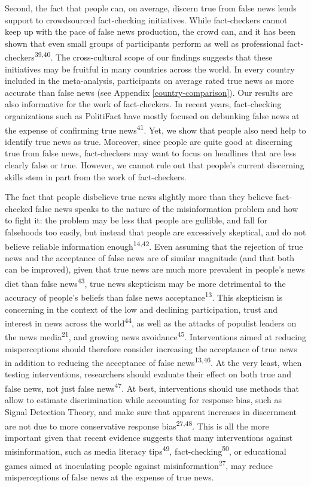 \documentclass[
  doc,floatsintext]{apa6}
\begin{document}
Second, the fact that people can, on average, discern true from false news lends support to crowdsourced fact-checking initiatives. While fact-checkers cannot keep up with the pace of false news production, the crowd can, and it has been shown that even small groups of participants perform as well as professional fact-checkers\textsuperscript{39,40}. The cross-cultural scope of our findings suggests that these initiatives may be fruitful in many countries across the world. In every country included in the meta-analysis, participants on average rated true news as more accurate than false news (see Appendix \ref{country-comparison}). Our results are also informative for the work of fact-checkers. In recent years, fact-checking organizations such as PolitiFact have mostly focused on debunking false news at the expense of confirming true news\textsuperscript{41}. Yet, we show that people also need help to identify true news as true. Moreover, since people are quite good at discerning true from false news, fact-checkers may want to focus on headlines that are less clearly false or true. However, we cannot rule out that people's current discerning skills stem in part from the work of fact-checkers.

The fact that people disbelieve true news slightly more than they believe fact-checked false news speaks to the nature of the misinformation problem and how to fight it: the problem may be less that people are gullible, and fall for falsehoods too easily, but instead that people are excessively skeptical, and do not believe reliable information enough\textsuperscript{14,42}. Even assuming that the rejection of true news and the acceptance of false news are of similar magnitude (and that both can be improved), given that true news are much more prevalent in people's news diet than false news\textsuperscript{43}, true news skepticism may be more detrimental to the accuracy of people's beliefs than false news acceptance\textsuperscript{13}. This skepticism is concerning in the context of the low and declining participation, trust and interest in news across the world\textsuperscript{44}, as well as the attacks of populist leaders on the news media\textsuperscript{21}, and growing news avoidance\textsuperscript{45}. Interventions aimed at reducing misperceptions should therefore consider increasing the acceptance of true news in addition to reducing the acceptance of false news\textsuperscript{13,46}. At the very least, when testing interventions, researchers should evaluate their effect on both true and false news, not just false news\textsuperscript{47}. At best, interventions should use methods that allow to estimate discrimination while accounting for response bias, such as Signal Detection Theory, and make sure that apparent increases in discernment are not due to more conservative response bias\textsuperscript{27,48}. This is all the more important given that recent evidence suggests that many interventions against misinformation, such as media literacy tips\textsuperscript{49}, fact-checking\textsuperscript{50}, or educational games aimed at inoculating people against misinformation\textsuperscript{27}, may reduce misperceptions of false news at the expense of true news.
\end{document}
